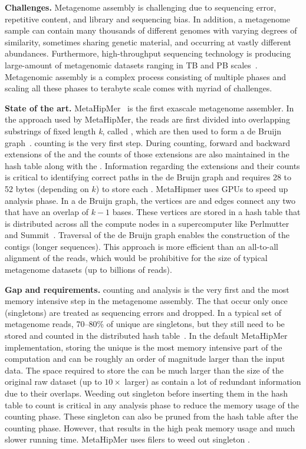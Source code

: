 \noindent
\textbf{Challenges.}
Metagenome assembly is challenging due to sequencing error, repetitive content, and library and sequencing bias. In addition, a metagenome sample can contain many thousands of different genomes with varying degrees of similarity, sometimes sharing genetic material, and occurring at vastly different abundances.
%
Furthermore, high-throughput sequencing technology is producing large-amount of metagenomic datasets ranging in TB and PB scales~\cite{hofmeyr2020terabase}. Metagenomic assembly is a complex process consisting of multiple phases and scaling all these phases to terabyte scale comes with myriad of challenges.

\noindent
\textbf{State of the art.}
MetaHipMer~\cite{GeorganasEHG18,HofmeyrEGC20} is the first exascale metagenome assembler.
In the approach used by MetaHipMer, the reads are first divided into overlapping substrings of fixed length \emph{k}, called \emph{\kmers}, which are then used to form a de Bruijn graph~\cite{CompeauPeTe11}.
\Kmer counting is the very first step. During \kmer counting, forward and backward extensions of the \kmer and the counts of those extensions are also maintained in the hash table along with the \kmer. Information regarding the extensions and their counts is critical to identifying correct paths in the de Bruijn graph and requires 28 to 52 bytes (depending on $k$) to store each \kmer.
MetaHipmer uses GPUs to speed up \kmer analysis phase.
In a de Bruijn graph, the vertices are \kmers and edges connect any two \kmers that have an overlap of $k-1$ bases. These vertices are stored in a hash table that is distributed across all the compute nodes in a supercomputer like Perlmutter~\cite{perlmutter} and Summit~\cite{summit}.
Traversal of the de Bruijn graph enables the construction of the contigs (longer sequences).  This approach is more efficient than an all-to-all alignment of the reads, which would be prohibitive for the size of typical metagenome datasets (up to billions of reads).

\noindent
\textbf{Gap and requirements.}
\Kmer counting and analysis is the very first and the most memory intensive step in the metagenome assembly. The \kmers that occur only once (singletons) are treated as sequencing errors and dropped. In a typical set of metagenome reads, 70--80\% of unique \kmers are singletons, but they still need to be stored and counted in the distributed hash table~.
In the default MetaHipMer implementation, storing the unique \kmers is the most memory intensive part of the computation and can be roughly an order of magnitude larger than the input data.  The space required to store the \kmers can be much larger than the size of the original raw dataset (up to $10\times$ larger) as \kmers contain a lot of redundant information due to their overlaps.
Weeding out singleton \kmers before inserting them in the hash table to count is critical in any \kmer analysis phase to reduce the memory usage of the counting phase. These singleton \kmers can also be pruned from the hash table after the counting phase. However, that results in the high peak memory usage and much slower running time. MetaHipMer uses filers to weed out singleton \kmers.

